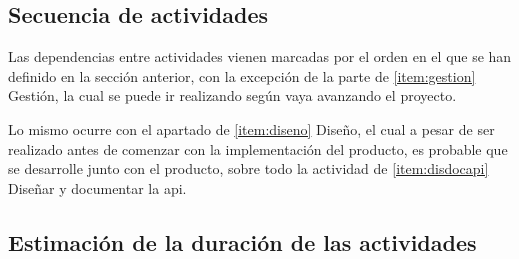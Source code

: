 \subsection{Secuencia de actividades}
Las dependencias entre actividades vienen marcadas por el orden en el que se
han definido en la sección anterior, con la excepción de la parte de
\ref{item:gestion} Gestión, la cual se puede ir realizando según vaya avanzando
el proyecto.

Lo mismo ocurre con el apartado de \ref{item:diseno} Diseño, el cual a pesar
de ser realizado antes de comenzar con la implementación del producto, es
probable que se desarrolle junto con el producto, sobre todo la actividad de
\ref{item:disdocapi} Diseñar y documentar la \gls{api}.

\subsection{Estimación de la duración de las actividades}

